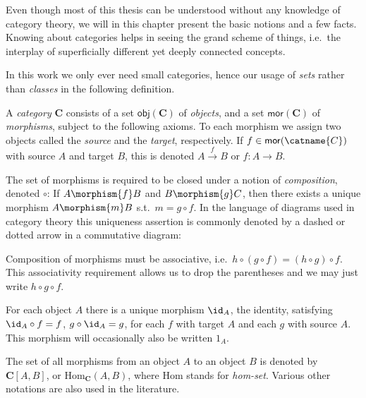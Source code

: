 \label{Appendix:Categories}
Even though most of this thesis can be understood without any knowledge of category theory, we will in this chapter present the basic notions and a few facts. Knowing about categories helps in seeing the grand scheme of things, i.e.\ the interplay of superficially different yet deeply connected concepts.

In this work we only ever need small categories, hence our usage of \emph{sets} rather than \emph{classes} in the following definition.
\begin{definition}[Category] A \emph{category} $\mathbf{C}$ consists of a set $\mathsf{obj}(\mathbf{C})$ of \emph{objects}, and a set $\mathsf{mor}(\mathbf{C})$ of \emph{morphisms}, subject to the following axioms. To each morphism we assign two objects called the \emph{source} and the \emph{target}, respectively. If $f\in\mathsf{mor}(\catname{C})$ with source $A$ and target $B$, this is denoted $A\stackrel{f}{\to} B$ or $f:A\rightarrow B$.

The set of morphisms is required to be closed under a notion of \emph{composition}, denoted $\circ$: If $A\morphism{f}B$ and $B\morphism{g}C$, then there exists a unique morphism $A\morphism{m}B$ s.t.\ $m = g\circ f$. In the language of diagrams used in category theory this uniqueness assertion is commonly denoted by a dashed or dotted arrow in a commutative diagram:

\begin{center}
\end{center}
Composition of morphisms must be associative, i.e.\ $h \circ \left( g \circ f\right) = \left( h\circ g \right)\circ f$. This associativity requirement allows us to drop the parentheses and we may just write $h\circ g\circ f$. 

For each object $A$ there is a unique morphism $\id_A$, the identity, satisfying $\id_A\circ f = f$, $g\circ \id_A = g$, for each $f$ with target $A$ and each $g$ with source $A$. This morphism will occasionally also be written $1_A$.
\end{definition}

The set of all morphisms from an object $A$ to an object $B$ is denoted by $\mathbf{C}[A,B]$, or $\mathrm{Hom}_\mathbf{C}\left( A,B \right)$, where $\mathrm{Hom}$ stands for \emph{hom-set}. Various other notations are also used in the literature.

